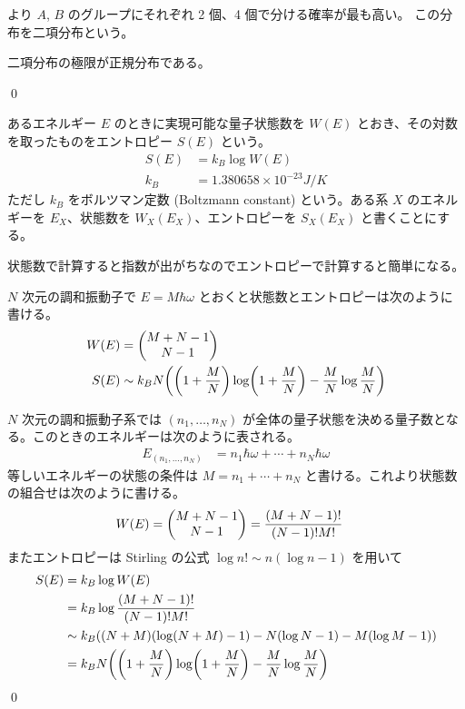 \documentclass[uplatex,dvipdfmx,a4paper,11pt]{jlreq}
\makeatletter
\theoremstyle{definition}
\renewenvironment{proof}[1][\proofname]{\par
  \normalfont
  \topsep6\p@\@plus6\p@ \trivlist
  \item[\hskip\labelsep{\bfseries #1}\@addpunct{\bfseries}]\ignorespaces\quad\par
}{%
  \qed\endtrivlist\@endpefalse
}
\renewcommand\proofname{証明}
\makeatother
\begin{document}
より $A$, $B$ のグループにそれぞれ 2 個、4 個で分ける確率が最も高い。
この分布を二項分布という。

\begin{proposition}
  二項分布の極限が正規分布である。
\end{proposition}
\begin{proof}
\end{proof}

\begin{definition}
  あるエネルギー $E$ のときに実現可能な量子状態数を $W(E)$ とおき、その対数を取ったものをエントロピー $S(E)$ という。
  \begin{align}
    S(E) & = k_B\log W(E)                     \\
    k_B  & = 1.380658\times 10^{-23} \si{J/K}
  \end{align}
  ただし $k_B$ をボルツマン定数 (Boltzmann constant) という。ある系 $X$ のエネルギーを $E_X$、状態数を $W_X(E_X)$、エントロピーを $S_X(E_X)$ と書くことにする。
\end{definition}
状態数で計算すると指数が出がちなのでエントロピーで計算すると簡単になる。

\begin{theorem}
  $N$ 次元の調和振動子で $E = M\hbar\omega$ とおくと状態数とエントロピーは次のように書ける。
  \begin{align}
    W(E) & = \mqty(M + N - 1                                                                      \\ N - 1) \\
    S(E) & \sim k_BN\qty(\qty(1 + \frac{M}{N})\log(1 + \frac{M}{N}) - \frac{M}{N}\log\frac{M}{N})
  \end{align}
\end{theorem}
\begin{proof}
  $N$ 次元の調和振動子系では $(n_1,\ldots,n_N)$ が全体の量子状態を決める量子数となる。このときのエネルギーは次のように表される。
  \begin{align}
    E_{(n_1,\ldots,n_N)} & = n_1\hbar\omega + \cdots + n_N\hbar\omega
  \end{align}
  等しいエネルギーの状態の条件は $M = n_1 + \cdots + n_N$ と書ける。これより状態数の組合せは次のように書ける。
  \begin{align}
    W(E) & = \mqty(M + N - 1 \\ N - 1) = \frac{(M + N - 1)!}{(N - 1)!M!}
  \end{align}
  またエントロピーは Stirling の公式 $\log n! \sim n(\log n - 1)$ を用いて
  \begin{align}
    S(E) & = k_B\log W(E)                                                                      \\
         & = k_B\log\frac{(M + N - 1)!}{(N - 1)!M!}                                            \\
         & \sim k_B\qty((N + M)(\log(N + M) - 1) - N(\log N - 1) - M(\log M - 1))              \\
         & = k_BN\qty(\qty(1 + \frac{M}{N})\log(1 + \frac{M}{N}) - \frac{M}{N}\log\frac{M}{N})
  \end{align}
\end{proof}
\end{document}
